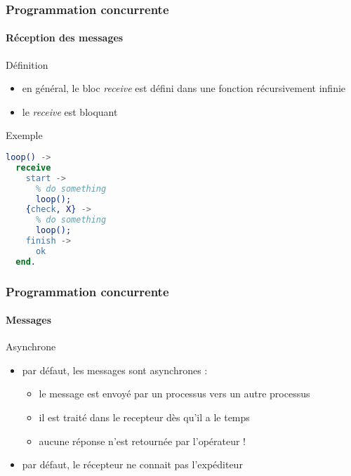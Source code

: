 \begin{frame}[fragile]
  \frametitle{Programmation concurrente}
  \framesubtitle{Réception des messages}

  \begin{block}{Définition}
    \begin{itemize}
    \item en général, le bloc \textit{receive} est défini dans une fonction
      récursivement infinie
    \item le \textit{receive} est bloquant
    \end{itemize}
  \end{block}

  \begin{exampleblock}{Exemple}
      \begin{lstlisting}[language=erlang]
loop() ->
  receive
    start ->
      % do something
      loop();
    {check, X} ->
      % do something
      loop();
    finish ->
      ok
  end.
      \end{lstlisting}
  \end{exampleblock}

\end{frame}

\begin{frame}[fragile]
  \frametitle{Programmation concurrente}
  \framesubtitle{Messages}

  \begin{block}{Asynchrone}
    \begin{itemize}
    \item par défaut, les messages sont asynchrones :
      \begin{itemize}
      \item le message est envoyé par un processus vers un autre processus
      \item il est traité dans le recepteur dès qu'il a le temps
      \item aucune réponse n'est retournée par l'opérateur !
    \end{itemize}
    \item par défaut, le récepteur ne connait pas l'expéditeur
    \end{itemize}
  \end{block}

\end{frame}

